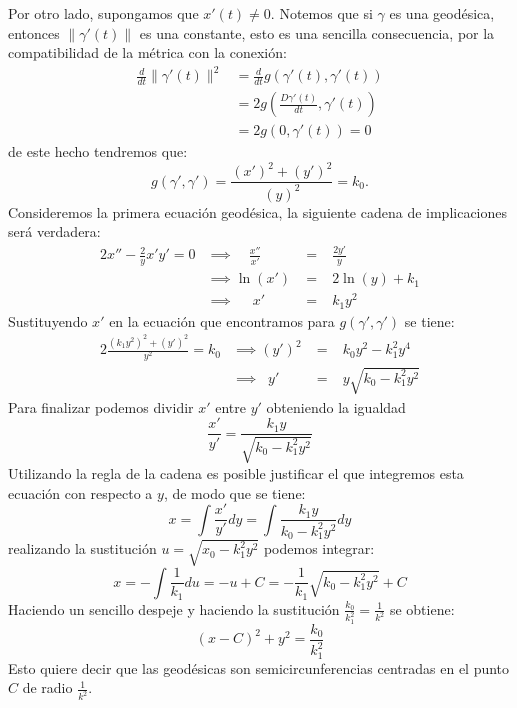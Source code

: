 \begin{example}
	Por otro lado, supongamos que $x'(t) \neq 0$. Notemos que si $\gamma$ es una geodésica, entonces $\|\gamma'(t)\|$ es una constante, esto es una sencilla consecuencia, por la compatibilidad de la métrica con la conexión:
	\begin{align*}
		\frac{d}{dt} \|\gamma'(t)\|^2 & = \frac{d}{dt} g(\gamma'(t),\gamma'(t))   \\
		                              & = 2 g(\frac{D\gamma'(t)}{dt}, \gamma'(t)) \\
		                              & = 2 g(0, \gamma'(t)) = 0
	\end{align*}
	de este hecho tendremos que:
	\[
		g(\gamma', \gamma') = \frac{(x')^{2} + (y')^{2}}{(y)^{2}} = k_0.
	\]
	Consideremos la primera ecuación geodésica, la siguiente cadena de implicaciones será verdadera:
	\begin{alignat*}{2}
		x'' - \frac{2}{y} x' y' =  0 & \implies \quad \frac{x''}{x'} & \; = \; & \frac{2y'}{y}  \\
		                             & \implies \ln(x')              & \; = \; & 2 \ln(y) + k_1 \\
		                             & \implies \quad\; x'           & \; = \; & k_{1}y^{2}
	\end{alignat*}
	Sustituyendo $x'$ en la ecuación que encontramos para $g(\gamma',\gamma')$ se tiene:
	\begin{alignat*}{2}
		\frac{(k_1 y^2)^2 + (y')^2}{y^2} = k_0 & \implies (y')^2  & \; = \; & k_0 y^{2} - k_1^2 y^4      \\
		                                       & \implies \;\; y' & \; = \; & y \sqrt{k_0 - k_1^2 y^{2}}
	\end{alignat*}
	Para finalizar podemos dividir $x'$ entre $y'$ obteniendo la igualdad
	\[
		\frac{x'}{y'} = \frac{k_1 y}{\sqrt{k_0 - k_1^2y^2}}
	\]
	Utilizando la regla de la cadena es posible justificar el que integremos esta ecuación con respecto a $y$, de modo que se tiene:
	\[
		x = \int \frac{x'}{y'} dy = \int \frac{k_1 y}{k_0 - k_{1}^{2}y^{2}} dy
	\]
	realizando la sustitución $u = \sqrt{x_0 - k_{1}^{2}y^{2}}$ podemos integrar:
	\[
		x = -\int \frac{1}{k_1} du = -u + C = -\frac{1}{k_1} \sqrt{k_0 - k_{1}^{2}y^{2}} + C
	\]
	Haciendo un sencillo despeje y haciendo la sustitución $\frac{k_0}{k_1^2} = \frac{1}{k^2}$ se obtiene:
	\[
		(x - C)^{2} + y^{2} = \frac{k_0}{k_{1}^{2}}
	\]
	Esto quiere decir que las geodésicas son semicircunferencias centradas en el punto $C$ de radio $\frac{1}{k^2}$.
\end{example}

